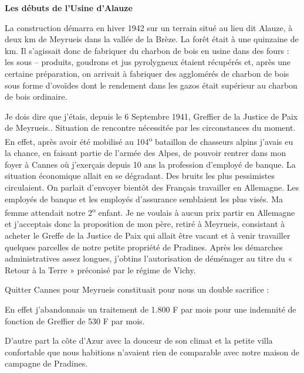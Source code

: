 \vspace{0.45cm}

\textbf{Les débuts de l’Usine d’Alauze}

\vspace{0.35cm}

La construction démarra en hiver 1942 sur un terrain situé au lieu dit Alauze, à deux km de
Meyrueis dans la vallée de la Brèze. La forêt était à une quinzaine de km. Il s’agissait donc de
fabriquer du charbon de bois en usine dans des fours : les sous – produits, goudrons et jus
pyrolygneux étaient récupérés et, après une certaine préparation, on arrivait à fabriquer des
agglomérés de charbon de bois sous forme d’ovoïdes dont le rendement dans les gazos était
supérieur au charbon de bois ordinaire.

\vspace{0.45cm}

Je dois dire que j’étais, depuis le 6 Septembre 1941, Greffier de la Justice de Paix de
Meyrueis.. Situation de rencontre nécessitée par les circonstances du moment. En effet, après
avoir été mobilisé au 104\textsuperscript{o} bataillon de chasseurs alpins j’avais eu la chance, en faisant partie
de l’armée des Alpes, de pouvoir rentrer dans mon foyer à Cannes où j’exerçais depuis 10 ans
la profession d’employé de banque. La situation économique allait en se dégradant. Des bruits
les plus pessimistes circulaient. On parlait d’envoyer bientôt des Français travailler en
Allemagne. Les employés de banque et les employés d’assurance semblaient les plus visés.
Ma femme attendait notre 2\textsuperscript{o} enfant. Je ne voulais à aucun prix partir en Allemagne et
j’acceptais donc la proposition de mon père, retiré à Meyrueis, consistant à acheter le Greffe
de la Justice de Paix qui allait être vacant et à venir travailler quelques parcelles de notre
petite propriété de Pradines. Après les démarches administratives assez longues, j’obtins
l’autorisation de déménager au titre du « Retour à la Terre » préconisé par le régime de
Vichy.

\vspace{0.45cm}

Quitter Cannes pour Meyrueis constituait pour nous un double sacrifice :

En effet j’abandonnais un traitement de 1.800 F par mois pour une indemnité de fonction de
Greffier de 530 F par mois.

D’autre part la côte d’Azur avec la douceur de son climat et la petite villa confortable que
nous habitions n’avaient rien de comparable avec notre maison de campagne de Pradines.

